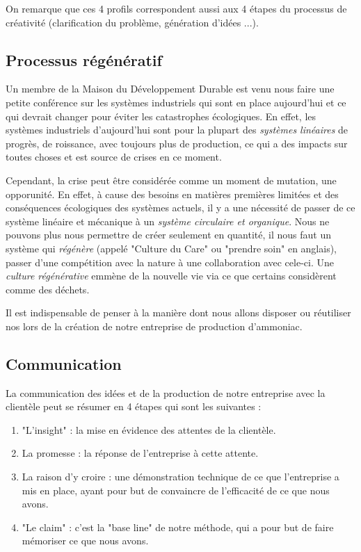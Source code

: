 On remarque que ces 4 profils correspondent aussi aux 4 étapes du processus de créativité
(clarification du problème, génération d'idées ...).

\subsection{Processus régénératif}
Un membre de la Maison du Développement Durable est venu nous faire une petite conférence sur
les systèmes industriels qui sont en place aujourd'hui et ce qui devrait changer pour éviter
les catastrophes écologiques. En effet, les systèmes industriels d'aujourd'hui sont pour la plupart
des \textit{systèmes linéaires} de progrès, de roissance, avec toujours plus de production,
ce qui a des impacts sur toutes choses et est source de crises en ce moment.

Cependant, la crise peut être considérée comme un moment de mutation, une opporunité.
En effet, à cause des besoins en matières premières limitées et des conséquences écologiques
des systèmes actuels, il y a une nécessité de passer de ce système linéaire et mécanique à
un \textit{système circulaire et organique}. Nous ne pouvons plus nous permettre de créer
seulement en quantité, il nous faut un système qui \textit{régénère} (appelé "Culture du Care"
ou "prendre soin" en anglais), passer d'une compétition avec la nature à une collaboration avec cele-ci.
Une \textit{culture régénérative} emmène de la nouvelle vie via ce que certains considèrent comme des déchets.

Il est indispensable de penser à la manière dont nous allons disposer ou réutiliser nos lors de la création de 
notre entreprise de production d'ammoniac.

\subsection{Communication}
La communication des idées et de la production de notre entreprise avec la clientèle peut se résumer 
en 4 étapes qui sont les suivantes :

\begin{enumerate}
	\item "L'insight" : la mise en évidence des attentes de la clientèle.
	\item La promesse : la réponse de l'entreprise à cette attente.
	\item La raison d'y croire : une démonstration technique de ce que l'entreprise a mis en place,
	ayant pour but de convaincre de l'efficacité de ce que nous avons.
	\item "Le claim" : c'est la "base line" de notre méthode, qui a pour but de faire mémoriser ce que nous avons.
\end{enumerate}


